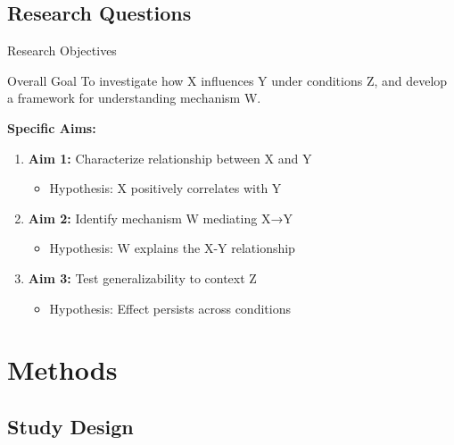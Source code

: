 \documentclass[aspectratio=169,11pt]{beamer}
\begin{document}
\subsection{Research Questions}

\begin{frame}{Research Objectives}
  \begin{exampleblock}{Overall Goal}
    To investigate how X influences Y under conditions Z, and develop a framework for understanding mechanism W.
  \end{exampleblock}
  
  \vspace{0.5cm}
  
  \textbf{Specific Aims:}
  \begin{enumerate}
    \item \textbf{Aim 1:} Characterize relationship between X and Y
    \begin{itemize}
      \item Hypothesis: X positively correlates with Y
    \end{itemize}
    
    \item \textbf{Aim 2:} Identify mechanism W mediating X→Y
    \begin{itemize}
      \item Hypothesis: W explains the X-Y relationship
    \end{itemize}
    
    \item \textbf{Aim 3:} Test generalizability to context Z
    \begin{itemize}
      \item Hypothesis: Effect persists across conditions
    \end{itemize}
  \end{enumerate}
\end{frame}


\section{Methods}

\subsection{Study Design}
\end{document}
